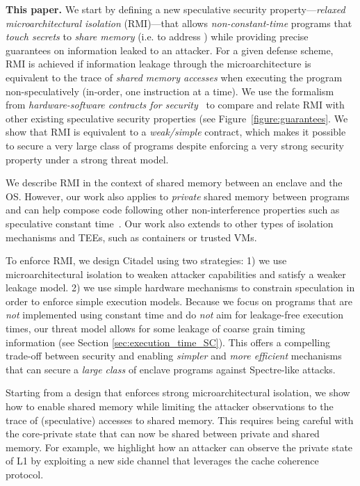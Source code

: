 \textbf{This paper.}
We start by defining a new speculative security property---\emph{relaxed microarchitectural isolation} (RMI)---that allows \emph{non-constant-time} programs that \emph{touch secrets} to \emph{share memory} (i.e. to address \prob) while providing precise guarantees on information leaked to an attacker.
For a given defense scheme, RMI is achieved if information leakage through the microarchitecture is equivalent to the trace of \emph{shared memory accesses} when executing the program non-speculatively (in-order, one instruction at a time).
We use the formalism from \emph{hardware-software contracts for security}~\cite{guarnieri2020spectector,guarnieri2021hardware, mosier2022axiomatic, cauligi2022sok} to compare and relate RMI with other existing speculative security properties (see Figure~\ref{figure:guarantees}.
We show that RMI is equivalent to a \emph{weak/simple} contract, which makes it possible to secure a very large class of programs despite enforcing a very strong security property under a strong threat model.

We describe RMI in the context of shared memory between an enclave and the OS.
However, our work also applies to \emph{private} shared memory between programs and can help compose code following other non-interference properties such as speculative constant time~\cite{guarnieri2020spectector}.
Our work also extends to other types of isolation mechanisms and TEEs, such as containers or trusted VMs.


To enforce RMI, we design Citadel using two strategies: 1) we use microarchitectural isolation to weaken attacker capabilities and satisfy a weaker leakage model.
2) we use simple hardware mechanisms to constrain speculation in order to enforce simple execution models.
Because we focus on programs that are \emph{not} implemented using constant time and do \emph{not} aim for leakage-free execution times, our threat model allows for some leakage of coarse grain timing information (see Section \ref{sec:execution_time_SC}).
This offers a compelling trade-off between security and enabling \emph{simpler} and \emph{more efficient} mechanisms that can secure a \emph{large class} of enclave programs against Spectre-like attacks.

Starting from a design that enforces strong microarchitectural isolation, we show how to enable shared memory while limiting the attacker observations to the trace of (speculative) accesses to shared memory.
This requires being careful with the core-private state that can now be shared between private and shared memory.
For example, we highlight how an attacker can observe the private state of L1 by exploiting a new side channel that leverages the cache coherence protocol.

